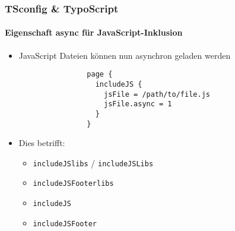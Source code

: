 
\begin{frame}[fragile]
	\frametitle{TSconfig \& TypoScript}
	\framesubtitle{Eigenschaft async für JavaScript-Inklusion}

	\begin{itemize}
		\item JavaScript Dateien können nun asynchron geladen werden

			\begin{lstlisting}
				page {
				  includeJS {
				    jsFile = /path/to/file.js
				    jsFile.async = 1
				  }
				}
			\end{lstlisting}

		\item Dies betrifft:

			\begin{itemize}
				\item \texttt{includeJSlibs} / \texttt{includeJSLibs}
				\item \texttt{includeJSFooterlibs}
				\item \texttt{includeJS}
				\item \texttt{includeJSFooter}
			\end{itemize}

	\end{itemize}

\end{frame}


